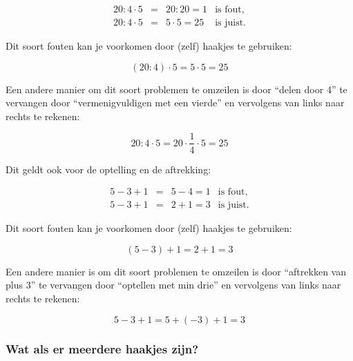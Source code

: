 \begin{voorbeeld}

\begin{equation*}
\begin{array}{ccrl}
20 : 4 \cdot 5 &=& 20:20 =1 & \text{is fout,} \\
20 : 4 \cdot 5 &=& 5 \cdot 5 =25 & \text{is juist.}
\end{array}
\end{equation*}
	
Dit soort fouten kan je voorkomen door (zelf) haakjes te gebruiken:

\begin{equation*}
(20 : 4) \cdot 5 = 5 \cdot 5 = 25
\end{equation*}

Een andere manier om dit soort problemen te omzeilen is door “delen door 4” te vervangen door “vermenigvuldigen met een vierde” en vervolgens van links naar rechts te rekenen:

\begin{equation*}
20 : 4 \cdot 5 = 20 \cdot \frac{1}{4} \cdot 5 = 25
\end{equation*}

Dit geldt ook voor de optelling en de aftrekking:

\begin{equation*}
\begin{array}{ccrl}
5-3+1 &=& 5-4 =1 & \text{is fout,} \\
5-3+1 &=& 2+1=3 & \text{is juist.}
\end{array}
\end{equation*}

Dit soort fouten kan je voorkomen door (zelf) haakjes te gebruiken:

\begin{equation*}
(5-3)+1 = 2+1=3 
\end{equation*}

Een andere manier is om dit soort problemen te omzeilen is door “aftrekken van plus 3” te vervangen door “optellen met min drie” en vervolgens van links naar rechts te rekenen:

\begin{equation*}
5-3+1 = 5+(-3)+1=3 
\end{equation*}

\end{voorbeeld}

\subsubsection{Wat als er meerdere haakjes zijn?}

